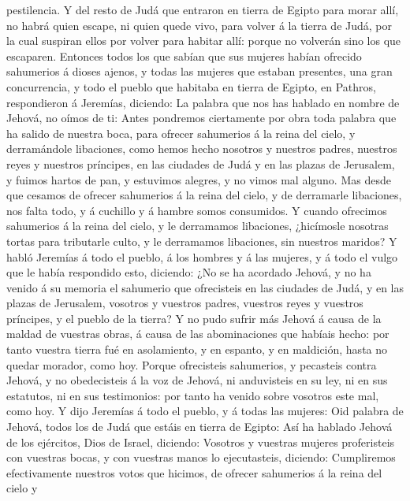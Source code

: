 pestilencia.  Y del resto de Judá que entraron en tierra
de Egipto para morar allí, no habrá quien escape, ni quien quede vivo,
para volver á la tierra de Judá, por la cual suspiran ellos por volver
para habitar allí: porque no volverán sino los que escaparen.
 Entonces todos los que sabían que sus mujeres habían
ofrecido sahumerios á dioses ajenos, y todas las mujeres que estaban
presentes, una gran concurrencia, y todo el pueblo que habitaba en
tierra de Egipto, en Pathros, respondieron á Jeremías, diciendo:
 La palabra que nos has hablado en nombre de Jehová, no
oímos de ti:  Antes pondremos ciertamente por obra toda
palabra que ha salido de nuestra boca, para ofrecer sahumerios á la
reina del cielo, y derramándole libaciones, como hemos hecho nosotros y
nuestros padres, nuestros reyes y nuestros príncipes, en las ciudades de
Judá y en las plazas de Jerusalem, y fuimos hartos de pan, y estuvimos
alegres, y no vimos mal alguno.  Mas desde que cesamos de
ofrecer sahumerios á la reina del cielo, y de derramarle libaciones, nos
falta todo, y á cuchillo y á hambre somos consumidos.  Y
cuando ofrecimos sahumerios á la reina del cielo, y le derramamos
libaciones, ¿hicímosle nosotras tortas para tributarle culto, y le
derramamos libaciones, sin nuestros maridos?  Y habló
Jeremías á todo el pueblo, á los hombres y á las mujeres, y á todo el
vulgo que le había respondido esto, diciendo:  ¿No se ha
acordado Jehová, y no ha venido á su memoria el sahumerio que
ofrecisteis en las ciudades de Judá, y en las plazas de Jerusalem,
vosotros y vuestros padres, vuestros reyes y vuestros príncipes, y el
pueblo de la tierra?  Y no pudo sufrir más Jehová á causa
de la maldad de vuestras obras, á causa de las abominaciones que habíais
hecho: por tanto vuestra tierra fué en asolamiento, y en espanto, y en
maldición, hasta no quedar morador, como hoy.  Porque
ofrecisteis sahumerios, y pecasteis contra Jehová, y no obedecisteis á
la voz de Jehová, ni anduvisteis en su ley, ni en sus estatutos, ni en
sus testimonios: por tanto ha venido sobre vosotros este mal, como hoy.
 Y dijo Jeremías á todo el pueblo, y á todas las mujeres:
Oid palabra de Jehová, todos los de Judá que estáis en tierra de Egipto:
 Así ha hablado Jehová de los ejércitos, Dios de Israel,
diciendo: Vosotros y vuestras mujeres proferisteis con vuestras bocas, y
con vuestras manos lo ejecutasteis, diciendo: Cumpliremos efectivamente
nuestros votos que hicimos, de ofrecer sahumerios á la reina del cielo y
